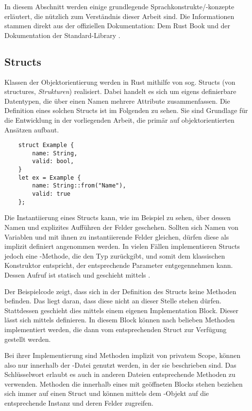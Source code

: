 In diesem Abschnitt werden einige grundlegende Sprachkonstrukte/-konzepte erläutert, die nützlich zum Verständnis dieser Arbeit sind.
Die Informationen stammen direkt aus der offiziellen Dokumentation: Dem Rust Book \cite{rustBook} und der Dokumentation der Standard-Library \cite{rustDoc}.

\subsection{Structs}

Klassen der Objektorientierung werden in Rust mithilfe von sog. \glqq Structs\grqq{} (von structures, \textit{Strukturen}) realisiert. Dabei handelt es sich um eigens definierbare Datentypen, die über einen Namen mehrere Attribute zusammenfassen. Die Definition eines solchen Structs ist im Folgenden zu sehen. Sie sind Grundlage für die Entwicklung in der vorliegenden Arbeit, die primär auf objektorientierten Ansätzen aufbaut.

\begin{verbatim}
    struct Example {
        name: String,
	    valid: bool,
    }
    let ex = Example { 
        name: String::from("Name"), 
        valid: true
    };
\end{verbatim}

Die Instantiierung eines Structs kann, wie im Beispiel zu sehen, über dessen Namen und explizites Aufführen der Felder geschehen. Sollten sich Namen von Variablen und mit ihnen zu instantiierende Felder gleichen, dürfen diese als implizit definiert angenommen werden. In vielen Fällen implementieren Structs jedoch eine -Methode, die den Typ  zurückgibt, und somit dem klassischen Konstruktor entspricht, der entsprechende Parameter entgegennehmen kann. Dessen Aufruf ist statisch und geschieht mittels .

Der Beispielcode zeigt, dass sich in der Definition des Structs  keine Methoden befinden. Das liegt daran, dass diese nicht an dieser Stelle stehen dürfen. Stattdessen geschieht dies mittels einem eigenen \glqq Implementation Block\grqq. Dieser lässt sich mittels  definieren. In diesem Block können nach belieben Methoden implementiert werden, die dann vom entsprechenden Struct zur Verfügung gestellt werden. 

Bei ihrer Implementierung sind Methoden implizit von privatem Scope, können also nur innerhalb der -Datei genutzt werden, in der sie beschrieben sind. Das Schlüsselwort  erlaubt es auch in anderen Dateien entsprechende Methoden zu verwenden. Methoden die innerhalb eines mit  geöffneten Blocks stehen beziehen sich immer auf einen Struct und können mittels dem -Objekt auf die entsprechende Instanz und deren Felder zugreifen.

